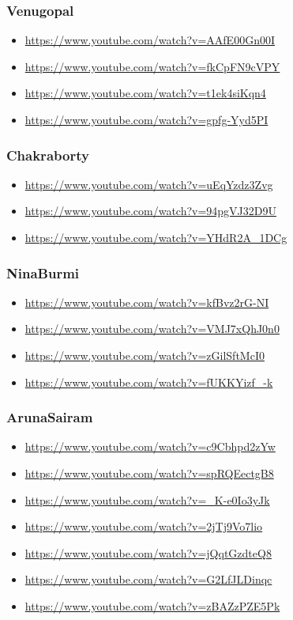 \subsubsection{Venugopal}
\label{sec:orgbb61767}
\begin{itemize}
\item \url{https://www.youtube.com/watch?v=AAfE00Gn00I}
\item \url{https://www.youtube.com/watch?v=fkCpFN9cVPY}
\item \url{https://www.youtube.com/watch?v=t1ek4siKqn4}
\item \url{https://www.youtube.com/watch?v=gpfg-Yyd5PI}
\end{itemize}

\subsubsection{Chakraborty}
\label{sec:org01952ec}
\begin{itemize}
\item \url{https://www.youtube.com/watch?v=uEqYzdz3Zvg}
\item \url{https://www.youtube.com/watch?v=94pgVJ32D9U}
\item \url{https://www.youtube.com/watch?v=YHdR2A\_1DCg}
\end{itemize}

\subsubsection{NinaBurmi}
\label{sec:org01535c9}
\begin{itemize}
\item \url{https://www.youtube.com/watch?v=kfBvz2rG-NI}
\item \url{https://www.youtube.com/watch?v=VMJ7xQhJ0n0}
\item \url{https://www.youtube.com/watch?v=zGilSftMcI0}
\item \url{https://www.youtube.com/watch?v=fUKKYizf\_-k}
\end{itemize}

\subsubsection{ArunaSairam}
\label{sec:org39b64af}
\begin{itemize}
\item \url{https://www.youtube.com/watch?v=c9Cbhpd2zYw}
\item \url{https://www.youtube.com/watch?v=spRQEectgB8}
\item \url{https://www.youtube.com/watch?v=\_K-e0Io3yJk}
\item \url{https://www.youtube.com/watch?v=2jTj9Vo7lio}
\item \url{https://www.youtube.com/watch?v=jQqtGzdteQ8}
\item \url{https://www.youtube.com/watch?v=G2LfJLDinqc}
\item \url{https://www.youtube.com/watch?v=zBAZzPZE5Pk}
\end{itemize}

